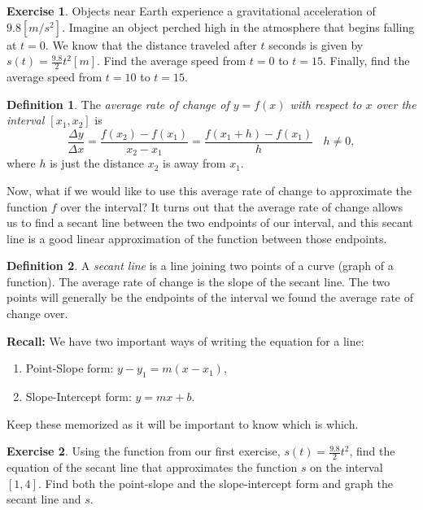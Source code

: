 \documentclass[leqno]{article}
\theoremstyle{definition}
\newtheorem{definition}{Definition}[section]
\newtheorem{exercise}{Exercise}[section]
\theoremstyle{remark}
\theoremstyle{theorem}
\begin{document}
\begin{exercise}
Objects near Earth experience a gravitational acceleration of $9.8[m/s^2]$. Imagine an object perched high in the atmosphere that begins falling at $t=0$. We know that the distance traveled after $t$ seconds is given by $s(t)=\frac{9.8}{2}t^2[m]$. Find the average speed from $t=0$ to $t=15$. Finally, find the average speed from $t=10$ to $t=15$.
\end{exercise}
\vspace*{4cm}

\begin{definition}
The \emph{average rate of change of $y=f(x)$ with respect to $x$ over the interval $[x_1,x_2]$} is 
\[
\frac{\Delta y}{\Delta x}=\frac{f(x_2)-f(x_1)}{x_2-x_1}=\frac{f(x_1+h)-f(x_1)}{h} ~~~~ h\neq 0,
\]
where $h$ is just the distance $x_2$ is away from $x_1$.
\end{definition}

Now, what if we would like to use this average rate of change to approximate the function $f$ over the interval? It turns out that the average rate of change allows us to find a secant line between the two endpoints of our interval, and this secant line is a good linear approximation of the function between those endpoints.

\begin{definition}
A \emph{secant line} is a line joining two points of a curve (graph of a function). The average rate of change is the slope of the secant line.  The two points will generally be the endpoints of the interval we found the average rate of change over.
\end{definition}
\vspace*{4cm}

\noindent \textbf{Recall:} We have two important ways of writing the equation for a line:
\begin{enumerate}[1.]
\item Point-Slope form: $y-y_1=m(x-x_1)$,
\item Slope-Intercept form: $y=mx+b$.
\end{enumerate}
Keep these memorized as it will be important to know which is which.

\begin{exercise}
Using the function from our first exercise, $s(t)=\frac{9.8}{2}t^2$, find the equation of the secant line that approximates the function $s$ on the interval $[1,4]$.  Find both the point-slope and the slope-intercept form and graph the secant line and $s$.
\end{exercise}
\vspace*{4cm}
\end{document}
